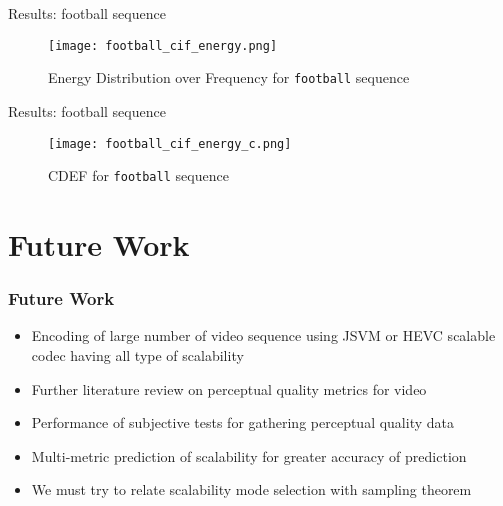 \documentclass{beamer}
\begin{document}
\begin{frame}{Results: football sequence}
\begin{figure}
\centering
\texttt{[image: football\_cif\_energy.png]}
\caption{Energy Distribution over Frequency for {\tt football} sequence}
\label{football_energy}
\end{figure}
\end{frame}

\begin{frame}{Results: football sequence}
\begin{figure}
\centering
\texttt{[image: football\_cif\_energy\_c.png]}
\caption{CDEF for {\tt football} sequence}
\label{football_energy}
\end{figure}
\end{frame}

\section{Future Work}
\begin{frame}\frametitle{Future Work}
\begin{itemize}
\item Encoding of large number of video sequence using JSVM or HEVC scalable codec having all type of scalability
\item Further literature review on perceptual quality metrics for video
\item Performance of subjective tests for gathering perceptual quality data
\item Multi-metric prediction of scalability for greater accuracy of prediction
\item We must try to relate scalability mode selection with sampling theorem
\end{itemize}
\end{frame}
\end{document}
